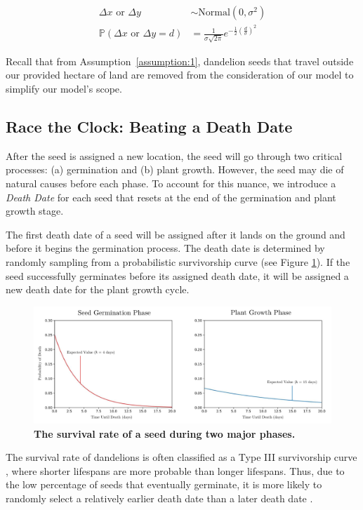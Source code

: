     \begin{align}
        \Delta x \text{ or } \Delta y & \sim \text{Normal}(0, \sigma^2) \\
        \mathbb{P}(\Delta x \text{ or } \Delta y = d) & = \frac{1}{\sigma \sqrt{2\pi}}e^{-\frac{1}{2}\left( \frac{d}{\sigma}\right)^2} \nonumber
    \end{align}
    
Recall that from Assumption~\ref{assumption:1}, dandelion seeds that travel outside our provided hectare of land are removed from the consideration of our model to simplify our model's scope.

\subsection{Race the Clock: Beating a Death Date}
After the seed is assigned a new location, the seed will go through two critical processes: (a) germination and (b) plant growth. However, the seed may die of natural causes before each phase. To account for this nuance, we introduce a \textit{Death Date} for each seed that resets at the end of the germination and plant growth stage. 

The first death date of a seed will be assigned after it lands on the ground and before it begins the germination process. The death date is determined by randomly sampling from a probabilistic survivorship curve (see Figure \ref{fig:exponentialdistribution}). If the seed successfully germinates before its assigned death date, it will be assigned a new death date for the plant growth cycle. 

\begin{figure}[h!]
\centering
    \includegraphics[scale=0.65]{figures/exponentialdistribution.pdf}
    \captionsetup{width=0.9\textwidth}
    \caption{\textbf{The survival rate of a seed during two major phases.}}
    \label{fig:exponentialdistribution}
\end{figure}

The survival rate of dandelions is often classified as a Type III survivorship curve \cite{noauthor_53_nodate}, where shorter lifespans are more probable than longer lifespans. Thus, due to the low percentage of seeds that eventually germinate, it is more likely to randomly select a relatively earlier death date than a later death date \cite{noauthor_dandelion_nodate-2}. 

